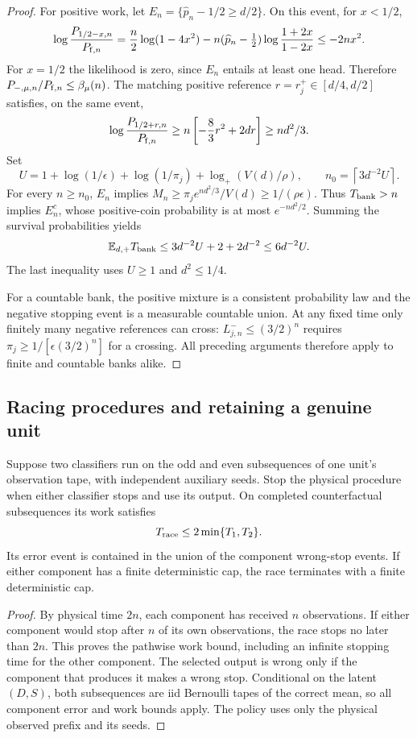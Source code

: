 \begin{proof}
For positive work, let
$E_n=\{\widehat p_n-1/2\ge d/2\}$. On this event, for $x<1/2$,
\[
 \log\frac{P_{1/2-x,n}}{P_{{\rm f},n}}
 =\frac n2\log(1-4x^2)
   -n(\widehat p_n-\tfrac12)
                 \log\frac{1+2x}{1-2x}
 \le-2nx^2.
\]
For $x=1/2$ the likelihood is zero, since $E_n$ entails at least one
head. Therefore $P_{-,\mu,n}/P_{{\rm f},n}\le\beta_\mu(n)$.
The matching positive reference $r=r_j^+\in[d/4,d/2]$ satisfies,
on the same event,
\[
 \log\frac{P_{1/2+r,n}}{P_{{\rm f},n}}
 \ge n\left[-\frac83r^2+2dr\right]\ge nd^2/3.
\]
Set
\[
 U=1+\log(1/\epsilon)+\log(1/\pi_j)
                  +\log_+(V(d)/\rho),\qquad
 n_0=\left\lceil3d^{-2}U\right\rceil.
\]
For every $n\ge n_0$, $E_n$ implies
$M_n\ge\pi_je^{nd^2/3}/V(d)\ge1/(\rho\epsilon)$.
Thus $T_{\rm bank}>n$ implies $E_n^c$, whose positive-coin probability
is at most $e^{-nd^2/2}$. Summing the survival probabilities yields
\[
 \mathbb E_{d,+}T_{\rm bank}
 \le3d^{-2}U+2+2d^{-2}\le6d^{-2}U.
\]
The last inequality uses $U\ge1$ and $d^2\le1/4$.

For a countable bank, the positive mixture is a consistent probability
law and the negative stopping event is a measurable countable union.
At any fixed time only finitely many negative references can cross:
$L^-_{j,n}\le(3/2)^n$ requires
$\pi_j\ge1/[\epsilon(3/2)^n]$ for a crossing. All preceding arguments
therefore apply to finite and countable banks alike.
\end{proof}

\subsection{Racing procedures and retaining a genuine unit}

\begin{lemma}\label{lem:uf-race}
Suppose two classifiers run on the odd and even subsequences of one
unit's observation tape, with independent auxiliary seeds. Stop the
physical procedure when either classifier stops and use its output.
On completed counterfactual subsequences its work satisfies
\[
 T_{\rm race}\le2\min\{T_1,T_2\}.
\]
Its error event is contained in the union of the component wrong-stop
events. If either component has a finite deterministic cap, the race
terminates with a finite deterministic cap.
\end{lemma}

\begin{proof}
By physical time $2n$, each component has received $n$ observations.
If either component would stop after $n$ of its own observations, the
race stops no later than $2n$. This proves the pathwise work bound,
including an infinite stopping time for the other component.
The selected output is wrong only if the component that produces it
makes a wrong stop. Conditional on the latent $(D,S)$, both
subsequences are iid Bernoulli tapes of the correct mean, so all
component error and work bounds apply. The policy uses only the
physical observed prefix and its seeds.
\end{proof}


